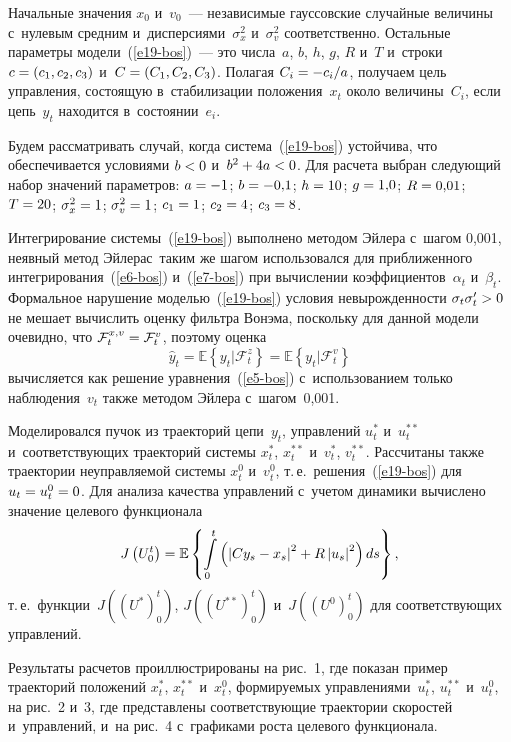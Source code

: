 \begin{multicols}{2}
     Начальные значения $x_0$ и~$v_0$~--- независимые гауссовские 
случайные величины с~нулевым средним и~дисперсиями~$\sigma_x^2$ 
и~$\sigma_v^2$ соответственно. Остальные параметры  
модели~(\ref{e19-bos})~--- это числа~$a$, $b$, $h$, $g$, $R$ и~$T$ и~строки 
$c\hm= (c_1, c_2, c_3)$ и~$C\hm= (C_1, C_2, C_3)$. Полагая $C_i\hm= -c_i/a$, 
получаем цель управления, состоящую в~стабилизации положения~$x_t$ 
около величины~$C_i$, если цепь~$y_t$ находится в~состоянии~$e_i$.
     
     Будем рассматривать случай, когда система~(\ref{e19-bos}) устойчива, 
что обеспечивается условиями $b\hm< 0$ и~$b^2\hm+ 4a \hm<0$. Для расчета 
выбран следующий набор
 значений параметров: $a\hm= -1$; $b\hm= -0{,}1$; 
$h\hm= 10$; $g\hm= 1{,}0$; $R\hm= 0{,}01$; $T\hm= 20$; $\sigma_x^2\hm=1$; 
$\sigma_v^2\hm=1$;  $c_1\hm=1$; $c_2\hm=4$; $c_3\hm=8$.
     
Интегрирование системы~(\ref{e19-bos}) выполнено методом Эйлера 
с~шагом 0,001, неявный метод Эйлера\linebreak с~таким же шагом использовался для 
при\-бли\-жен\-но\-го интегрирования~(\ref{e6-bos}) и~(\ref{e7-bos}) при 
вы\-чис\-ле\-нии коэффициентов~$\alpha_t$ и~$\beta_t$. Формальное нарушение 
мо\-делью~(\ref{e19-bos}) условия не\-вы\-рож\-ден\-ности $\sigma_t \sigma_t^\prime 
\hm>0$\linebreak не мешает вычислить оценку фильт\-ра Вонэма, поскольку для данной 
модели очевидно, что $\mathcal{F}_t^{x,v}\hm= \mathcal{F}_t^v$, поэтому оценка 
$$
\hat{y}_t= \mathbb{E}\left\{ y_t\vert \mathcal{F}_t^z\right\}= \mathbb{E}\left\{ y_t\vert \mathcal{F}_t^v\right\}
$$ 
вычисляется как решение 
уравнения~(\ref{e5-bos}) с~использованием только наблюдения~$v_t$ также 
методом Эйлера с~шагом~0,001.
     
     Моделировался пучок из  траекторий цепи~$y_t$, управлений $u_t^*$ 
и~$u_t^{**}$ и~соответствующих траекторий системы $x_t^*$, $x_t^{**}$ 
и~$v_t^*$, $v_t^{**}$. Рассчитаны также траектории неуправляемой 
системы $x_t^0$ и~$v_t^0$, т.\,е.\ решения~(\ref{e19-bos}) для $u_t\hm= 
u_t^0\hm=0$. Для анализа качества управлений с~учетом динамики 
вычислено значение целевого функционала 
     $$
     J\left(U_0^t\right)= \mathbb{E}\left\{ \int\limits_0^t \left( \left\vert C y_s 
- x_s\right\vert^2 \hm+ R\left\vert u_s\right\vert^2\right)ds\right\},
$$
 т.\,е.\ 
функции~$J((U^*)_0^t)$, $J((U^{**})_0^t)$ и~$J((U^0)_0^t)$ для 
соответствующих управлений.


     
     Результаты расчетов проиллюстрированы на рис.~1, где показан 
пример траекторий положений $x_t^*$, $x_t^{**}$ и~$x_t^0$, фор\-ми\-ру\-емых 
управлениями~$u_t^*$, $u_t^{**}$ и~$u_t^0$, на рис.~2 и~3, где пред\-став\-ле\-ны 
со\-от\-вет\-ст\-ву\-ющие тра\-ек\-то\-рии скоростей и~управ\-ле\-ний, и~на 
рис.~4 с~графиками роста целевого функционала.
     

\end{multicols}
